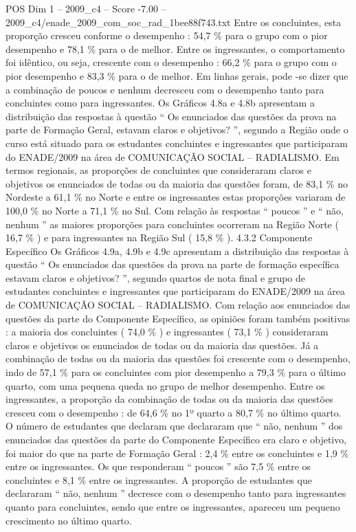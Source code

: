 \begin{textsample}{POS Dim 1 – 2009\_c4 – Score -7.00 – 2009\_c4/enade\_2009\_com\_soc\_rad\_1bee88f743.txt}
Entre os concluintes, esta proporção cresceu conforme o desempenho : 54,7 \% para o grupo com o pior desempenho e 78,1 \% para o de melhor.
Entre os ingressantes, o comportamento foi idêntico, ou seja, crescente com o desempenho : 66,2 \% para o grupo com o pior desempenho e 83,3 \% para o de melhor.
Em linhas gerais, pode -se dizer que a combinação de poucos e nenhum decresceu com o desempenho tanto para concluintes como para ingressantes.
Os Gráficos 4.8a e 4.8b apresentam a distribuição das respostas à questão “ Os enunciados das questões da prova na parte de Formação Geral, estavam claros e objetivos? ”, segundo a Região onde o curso está situado para os estudantes concluintes e ingressantes que participaram do ENADE/2009 na área de COMUNICAÇÃO SOCIAL – RADIALISMO.
Em termos regionais, as proporções de concluintes que consideraram claros e objetivos os enunciados de todas ou da maioria das questões foram, de 83,1 \% no Nordeste a 61,1 \% no Norte e entre os ingressantes estas proporções variaram de 100,0 \% no Norte a 71,1 \% no Sul.
Com relação às respostas “ poucos ” e “ não, nenhum ” as maiores proporções para concluintes ocorreram na Região Norte ( 16,7 \% ) e para ingressantes na Região Sul ( 15,8 \% ). 4.3.2 Componente Específico Os Gráficos 4.9a, 4.9b e 4.9c apresentam a distribuição das respostas à questão “ Os enunciados das questões da prova na parte de formação específica estavam claros e objetivos? ”, segundo quartos de nota final e grupo de estudantes concluintes e ingressantes que participaram do ENADE/2009 na área de COMUNICAÇÃO SOCIAL – RADIALISMO.
Com relação aos enunciados das questões da parte do Componente Específico, as opiniões foram também positivas : a maioria dos concluintes ( 74,0 \% ) e ingressantes ( 73,1 \% ) consideraram claros e objetivos os enunciados de todas ou da maioria das questões.
Já a combinação de todas ou da maioria das questões foi crescente com o desempenho, indo de 57,1 \% para os concluintes com pior desempenho a 79,3 \% para o último quarto, com uma pequena queda no grupo de melhor desempenho.
Entre os ingressantes, a proporção da combinação de todas ou da maioria das questões cresceu com o desempenho : de 64,6 \% no 1º quarto a 80,7 \% no último quarto.
O número de estudantes que declaram que declararam que “ não, nenhum ” dos enunciados das questões da parte do Componente Específico era claro e objetivo, foi maior do que na parte de Formação Geral : 2,4 \% entre os concluintes e 1,9 \% entre os ingressantes.
Os que responderam “ poucos ” são 7,5 \% entre os concluintes e 8,1 \% entre os ingressantes.
A proporção de estudantes que declararam “ não, nenhum ” decresce com o desempenho tanto para ingressantes quanto para concluintes, sendo que entre os ingressantes, apareceu um pequeno crescimento no último quarto.

\end{textsample}
